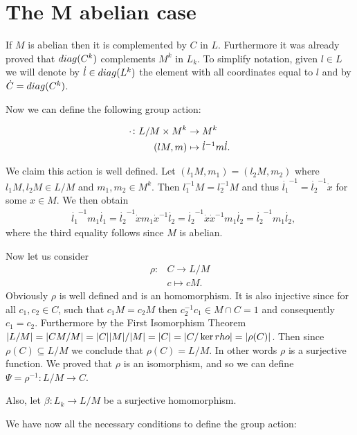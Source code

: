 \section{The M abelian case}

\newcommand{\dc}[0]{\dot{c}}

If $M$ is abelian then it is complemented by $C$ in $L$. Furthermore it was already proved that $diag({C^k})$ complements $M^k$ in $L_k$. To simplify notation, given $l \in L$ we will denote by $\dot{l} \in diag({L^k})$ the element with all coordinates equal to $l$ and by $\dot{C} = diag({C^k})$.

Now we can define the following group action:

\begin{align*}
    \cdot \colon L/M \times M^k &\rightarrow M^k \\
                (lM, m)  &\mapsto \dot{l}^{-1}m\dot{l}.
\end{align*}

We claim this action is well defined. Let $(l_1M, m_1) = (l_2M, m_2)$ where $l_1M, l_2M \in L/M$ and $m_1, m_2 \in M^k$.
Then $l_1^{-1}M = l_2^{-1}M$ and thus $\dot{l_1}^{-1} = \dot{l_2}^{-1}\dot{x}$ for some $x \in M$. We then obtain 
\begin{align*}
    &\dot{l_1}^{-1}m_1\dot{l_1} = \dot{l_2}^{-1}\dot{x}m_1\dot{x}^{-1}\dot{l_2} = \dot{l_2}^{-1}\dot{x}\dot{x}^{-1}m_1\dot{l_2} = \dot{l_2}^{-1}m_1\dot{l_2},
\end{align*}
where the third equality follows since $M$ is abelian.

Now let us consider
\begin{align*}
    \rho \colon &C \rightarrow L/M \\
                &c \mapsto cM.
\end{align*}
Obviously $\rho$ is well defined and is an homomorphism. It is also injective since for all $c_1, c_2 \in C$, such that $c_1M = c_2M$ then $c_2^{-1}c_1 \in M \cap C = 1$ and consequently $c_1 = c_2$. Furthermore by the First Isomorphism Theorem $| L/M | = | CM/M | = | C || M |/| M | = | C | = | C/\ker rho | = | \rho(C) |$. Then since $\rho(C) \subseteq L/M$ we conclude that $\rho(C) = L/M$. In other words $\rho$ is a surjective function. We proved that $\rho$ is an isomorphism, and so we can define $\Psi = \rho^{-1} \colon L/M \rightarrow C$.  

Also, let $\beta \colon L_k \rightarrow L/M$ be a surjective homomorphism.

We have now all the necessary conditions to define the group action:

